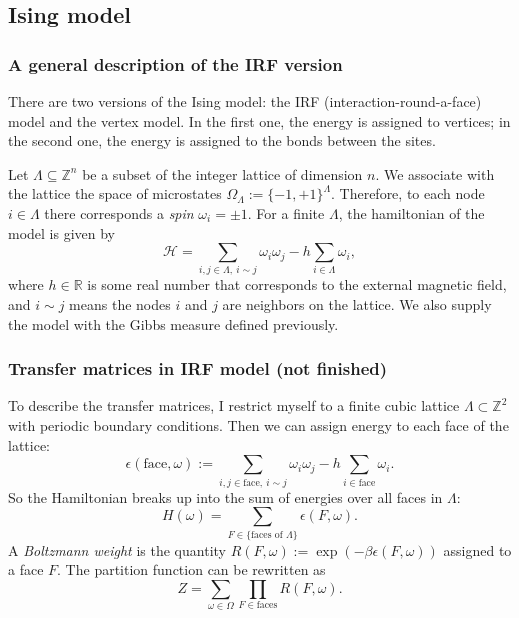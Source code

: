 \subsection{Ising model}
\subsubsection{A general description of the IRF version}
There are two versions of the Ising model: the IRF (interaction-round-a-face) model and the vertex model. In the first one, the energy is assigned to vertices; in the second one, the energy is assigned to the bonds between the sites. 

Let $\Lambda \subseteq \mathbb Z^n$ be a subset of the integer lattice of dimension $n$. We associate with the lattice the space of microstates $\Omega_{\Lambda} := \{-1,+1\}^{\Lambda}$. Therefore, to each node $i \in \Lambda$ there corresponds a \emph{spin} $\omega_i = \pm 1$. For a finite $\Lambda$, the hamiltonian of the model is given by
\[
\mathcal H = \sum_{i,j \in \Lambda, \ i \sim j} \omega_i \omega_j - h \sum_{i \in \Lambda} \omega_i,
\]
where $h \in \mathbb R$ is some real number that corresponds to the external magnetic field, and $i \sim j$ means the nodes $i$ and $j$ are neighbors on the lattice. We also supply the model with the Gibbs measure defined previously.

\subsubsection{Transfer matrices in IRF model (not finished)}
To describe the transfer matrices, I restrict myself to a finite cubic lattice $\Lambda\subset \mathbb Z^2$ with periodic boundary conditions. Then we can assign energy to each face of the lattice:
\[
\epsilon(\text{face},\omega) := \sum_{i,j \in \text{face}, \ i \sim j} \omega_i \omega_j - h \sum_{i \in \text{face}} \omega_i.
\]
So the Hamiltonian breaks up into the sum of energies over all faces in $\Lambda$: 
\[
H(\omega) = \sum_{F \in \{\text{faces of }\Lambda\}} \epsilon(F,\omega).
\]
A \emph{Boltzmann weight} is the quantity $R(F,\omega):=\exp(-\beta \epsilon(F,\omega))$ assigned to a face $F$. The partition function can be rewritten as
\[
Z = \sum_{\omega \in \Omega}\prod_{F \in \text{faces}} R(F,\omega).
\]

